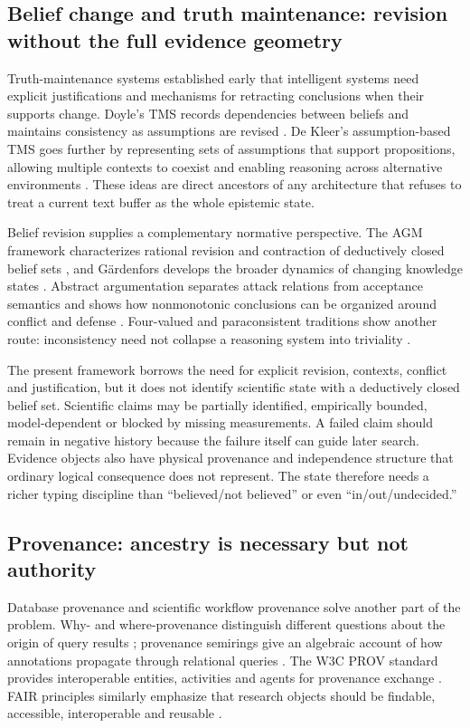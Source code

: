 \subsection{Belief change and truth maintenance: revision without the full evidence geometry}

Truth-maintenance systems established early that intelligent systems need explicit justifications and mechanisms for retracting conclusions when their supports change. Doyle's TMS records dependencies between beliefs and maintains consistency as assumptions are revised \cite{doyle1979}. De Kleer's assumption-based TMS goes further by representing sets of assumptions that support propositions, allowing multiple contexts to coexist and enabling reasoning across alternative environments \cite{dekleer1986}. These ideas are direct ancestors of any architecture that refuses to treat a current text buffer as the whole epistemic state.

Belief revision supplies a complementary normative perspective. The AGM framework characterizes rational revision and contraction of deductively closed belief sets \cite{agm1985}, and G\"ardenfors develops the broader dynamics of changing knowledge states \cite{gardenfors1988}. Abstract argumentation separates attack relations from acceptance semantics and shows how nonmonotonic conclusions can be organized around conflict and defense \cite{dung1995}. Four-valued and paraconsistent traditions show another route: inconsistency need not collapse a reasoning system into triviality \cite{belnap1977}.

The present framework borrows the need for explicit revision, contexts, conflict and justification, but it does not identify scientific state with a deductively closed belief set. Scientific claims may be partially identified, empirically bounded, model-dependent or blocked by missing measurements. A failed claim should remain in negative history because the failure itself can guide later search. Evidence objects also have physical provenance and independence structure that ordinary logical consequence does not represent. The state therefore needs a richer typing discipline than ``believed/not believed'' or even ``in/out/undecided.''

\subsection{Provenance: ancestry is necessary but not authority}

Database provenance and scientific workflow provenance solve another part of the problem. Why- and where-provenance distinguish different questions about the origin of query results \cite{buneman2001}; provenance semirings give an algebraic account of how annotations propagate through relational queries \cite{green2007}. The W3C PROV standard provides interoperable entities, activities and agents for provenance exchange \cite{prov2013}. FAIR principles similarly emphasize that research objects should be findable, accessible, interoperable and reusable \cite{wilkinson2016}.

